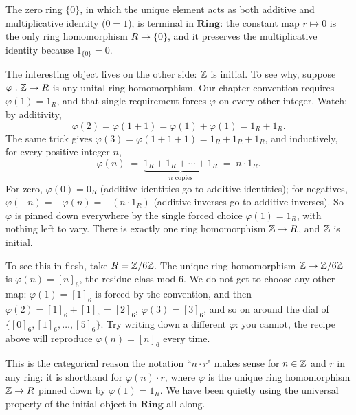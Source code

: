 \begin{example}\label{ex:ring-initial-terminal}
The zero ring $\{0\}$, in which the unique element acts as both additive
and multiplicative identity ($0 = 1$), is terminal in $\mathbf{Ring}$:
the constant map $r \mapsto 0$ is the only ring homomorphism $R \to \{0\}$,
and it preserves the multiplicative identity because $1_{\{0\}} = 0$.

The interesting object lives on the other side: ${\mathbb{Z}}$ is initial. To see
why, suppose $\varphi : {\mathbb{Z}} \to R$ is any unital ring homomorphism. Our
chapter convention requires $\varphi(1) = 1_R$, and that single
requirement forces $\varphi$ on every other integer. Watch: by additivity,
\[
    \varphi(2) = \varphi(1+1) = \varphi(1) + \varphi(1) = 1_R + 1_R.
\]
The same trick gives $\varphi(3) = \varphi(1+1+1) = 1_R + 1_R + 1_R$, and
inductively, for every positive integer $n$,
\[
    \varphi(n) \; = \; \underbrace{1_R + 1_R + \cdots + 1_R}_{n \text{ copies}}
    \; = \; n \cdot 1_R.
\]
For zero, $\varphi(0) = 0_R$ (additive identities go to additive
identities); for negatives, $\varphi(-n) = -\varphi(n) = -(n \cdot 1_R)$
(additive inverses go to additive inverses). So $\varphi$ is pinned down
everywhere by the single forced choice $\varphi(1) = 1_R$, with nothing
left to vary. There is exactly one ring homomorphism ${\mathbb{Z}} \to R$, and ${\mathbb{Z}}$
is initial.

To see this in flesh, take $R = {\mathbb{Z}}/6{\mathbb{Z}}$. The unique ring homomorphism
${\mathbb{Z}} \to {\mathbb{Z}}/6{\mathbb{Z}}$ is $\varphi(n) = [n]_6$, the residue class mod $6$. We
do not get to choose any other map: $\varphi(1) = [1]_6$ is forced by
the convention, and then $\varphi(2) = [1]_6 + [1]_6 = [2]_6$,
$\varphi(3) = [3]_6$, and so on around the dial of
$\{[0]_6, [1]_6, \ldots, [5]_6\}$. Try writing down a different
$\varphi$: you cannot, the recipe above will reproduce $\varphi(n) =
[n]_6$ every time.

This is the categorical reason the notation ``$n \cdot r$" makes sense
for $n \in {\mathbb{Z}}$ and $r$ in any ring: it is shorthand for
$\varphi(n) \cdot r$, where $\varphi$ is the unique ring homomorphism
${\mathbb{Z}} \to R$ pinned down by $\varphi(1) = 1_R$. We have been quietly using
the universal property of the initial object in $\mathbf{Ring}$ all
along.
\end{example}

